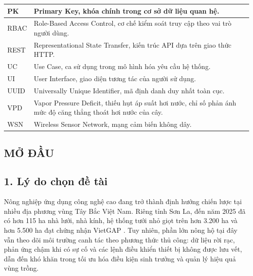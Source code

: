 \documentclass[13pt,a4paper]{extarticle}
\numberwithin{figure}{section}
\numberwithin{table}{section}
\begin{document}
\begin{longtable}{|p{3cm}|p{11cm}|}
		\hline
		PK & Primary Key, khóa chính trong cơ sở dữ liệu quan hệ. \\
		\hline
		RBAC & Role-Based Access Control, cơ chế kiểm soát truy cập theo vai trò người dùng. \\
		\hline
		REST & Representational State Transfer, kiến trúc API dựa trên giao thức HTTP. \\
		\hline
		UC & Use Case, ca sử dụng trong mô hình hóa yêu cầu hệ thống. \\
		\hline
		UI & User Interface, giao diện tương tác của người sử dụng. \\
		\hline
		UUID & Universally Unique Identifier, mã định danh duy nhất toàn cục. \\
		\hline
		VPD & Vapor Pressure Deficit, thiếu hụt áp suất hơi nước, chỉ số phản ánh mức độ căng thẳng thoát hơi nước của cây. \\
		\hline
		WSN & Wireless Sensor Network, mạng cảm biến không dây. \\
		\hline
	\end{longtable}
	
	\clearpage
	
	\begin{center}
		\section*{MỞ ĐẦU}
	\end{center}
	
	\subsection*{1. Lý do chọn đề tài}
	
	Nông nghiệp ứng dụng công nghệ cao đang trở thành định hướng chiến lược tại nhiều địa phương vùng Tây Bắc Việt Nam. Riêng tỉnh Sơn La, đến năm 2025 đã có hơn 115 ha nhà lưới, nhà kính, hệ thống tưới nhỏ giọt trên hơn 3.200 ha và hơn 5.500 ha đạt chứng nhận VietGAP \cite{boKhoaHoc2025a}. Tuy nhiên, phần lớn nông hộ tại đây vẫn theo dõi môi trường canh tác theo phương thức thủ công: dữ liệu rời rạc, phản ứng chậm khi có sự cố và các lệnh điều khiển thiết bị không được lưu vết, dẫn đến khó khăn trong tối ưu hóa điều kiện sinh trưởng và quản lý hiệu quả vùng trồng.
	
\end{document}
